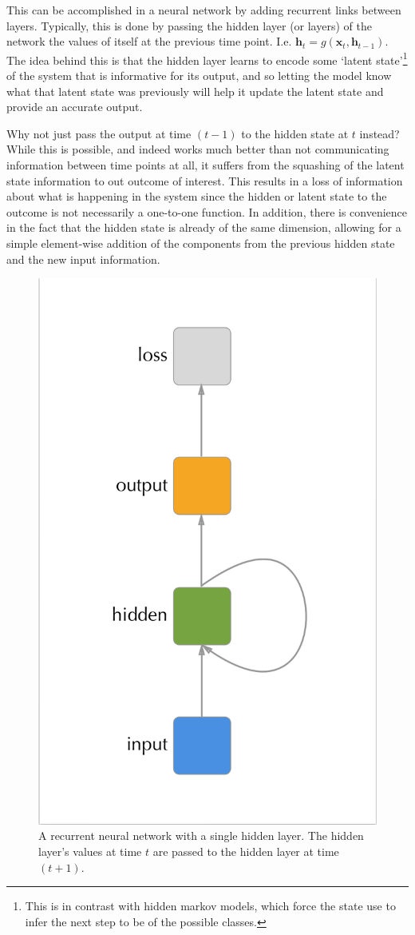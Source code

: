 \documentclass[]{book}
\let\rmarkdownfootnote\footnote%
\def\footnote{\protect\rmarkdownfootnote}
\theoremstyle{definition}
\theoremstyle{definition}
\theoremstyle{definition}
\theoremstyle{remark}
\begin{document}
This can be accomplished in a neural network by adding recurrent links
between layers. Typically, this is done by passing the hidden layer (or
layers) of the network the values of itself at the previous time point.
I.e. \(\mathbf{h}_{t} = g(\mathbf{x}_t, \mathbf{h}_{t - 1})\). The idea
behind this is that the hidden layer learns to encode some `latent
state'\footnote{This is in contrast with hidden markov models, which
  force the state use to infer the next step to be of the possible
  classes.} of the system that is informative for its output, and so
letting the model know what that latent state was previously will help
it update the latent state and provide an accurate output.

Why not just pass the output at time \((t-1)\) to the hidden state at
\(t\) instead? While this is possible, and indeed works much better than
not communicating information between time points at all, it suffers
from the squashing of the latent state information to out outcome of
interest. This results in a loss of information about what is happening
in the system since the hidden or latent state to the outcome is not
necessarily a one-to-one function. In addition, there is convenience in
the fact that the hidden state is already of the same dimension,
allowing for a simple element-wise addition of the components from the
previous hidden state and the new input information.

\begin{figure}

{\centering \includegraphics[width=0.4\linewidth]{figures/rnn_compact} 

}

\caption{A recurrent neural network with a single hidden layer. The hidden layer's values at time $t$ are passed to the hidden layer at time $(t + 1)$.}\label{fig:cyclegraph}
\end{figure}
\end{document}
